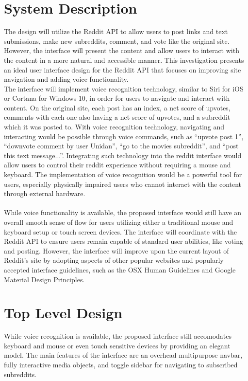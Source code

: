 \documentclass{article}
\begin{document}
\section{System Description} The design will utilize the Reddit API to allow users to post links and text submissions, make new subreddits, comment, and vote like the original site. However, the interface will present the content and allow users to interact with the content in a more natural and accessible manner. This investigation presents an ideal user interface design for the Reddit API that focuses on improving site navigation and adding voice functionality.
\\
\indent The interface will implement voice recognition technology, similar to Siri for iOS or Cortana for Windows 10, in order for users to navigate and interact with content. On the original site, each post has an index, a net score of upvotes, comments with each one also having a net score of upvotes, and a subreddit which it was posted to. With voice recognition technology, navigating and interacting would be possible through voice commands, such as ``upvote post 1'', ``downvote comment by user Unidan'', ``go to the movies subreddit'', and ``post this text message...''. Integrating such technology into the reddit interface would allow users to control their reddit experience without requiring a mouse and keyboard. The implementation of voice recognition would be a powerful tool for users, especially physically impaired users who cannot interact with the content through external hardware.\\
\\
\indent While voice functionality is available, the proposed interface would still have an overall smooth sense of flow for users utilizing either a traditional mouse and keyboard setup or touch screen devices. The interface will coordinate with the Reddit API to ensure users remain capable of standard user abilities, like voting and posting. However, the interface will improve upon the current layout of Reddit's site by adopting aspects of other popular websites and popularly accepted interface guidelines, such as the OSX Human Guidelines and Google Material Design Principles.

\section{Top Level Design} While voice recognition is available, the proposed interface still accomodates keyboard and mouse or even touch sensitive devices by providing an elegant model. The main features of the interface are an overhead multipurpose navbar, fully interactive media objects, and toggle sidebar for navigating to subscribed subreddits.
\end{document}
